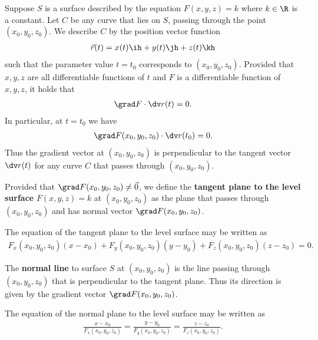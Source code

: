 \documentclass{article}
\begin{document}
\begin{theorem}
    Suppose $S$ is a surface described by the equation $F(x,y,z)=k$ where
    $k\in\R$ is a constant. Let $C$ be any curve that lies on $S$, passing
    through the point $(x_0,y_0,z_0)$. We describe $C$ by the position vector
    function
    \begin{align*}
        \vec r(t) = x(t)\ih + y(t)\jh + z(t)\kh
    \end{align*}
    such that the parameter value $t=t_0$ corresponds to $(x_0, y_0, z_0)$.
    Provided that $x,y,z$ are all differentiable functions of $t$ and $F$
    is a differentiable function of $x,y,z$, it holds that
    \begin{align*}
        \grad F \cdot \dv r(t) = 0.
    \end{align*}
    In particular, at $t=t_0$ we have
    \begin{align*}
        \grad F(x_0, y_0, z_0)\cdot \dv r(t_0) = 0.
    \end{align*}
    Thus the gradient vector at $(x_0, y_0, z_0)$ is perpendicular to the
    tangent vector $\dv r(t)$ for any curve $C$ that passes through
    $(x_0, y_0, z_0)$.
\end{theorem}
\begin{definition}
    Provided that $\grad F(x_0, y_0, z_0)\not=\vec 0$, we define the
    \textbf{tangent plane to the level surface} $F(x,y,z)=k$ at $(x_0, y_0, z_0)$
    as the plane that passes through $(x_0, y_0, z_0)$ and has normal vector
    $\grad F(x_0, y_0, z_0)$.
\end{definition}
\begin{theorem}
    The equation of the tangent plane to the level surface may be written as
    \begin{align*}
        F_x(x_0, y_0, z_0)(x-x_0)+F_y(x_0, y_0, z_0)(y-y_0)+F_z(x_0, y_0, z_0)(z-z_0)=0.
    \end{align*}
\end{theorem}
\begin{definition}
    The \textbf{normal line} to surface $S$ at $(x_0, y_0, z_0)$ is the line
    passing through $(x_0, y_0, z_0)$ that is perpendicular to the tangent
    plane. Thus its direction is given by the gradient vector
    $\grad F(x_0, y_0, z_0)$.
\end{definition}
\begin{theorem}
    The equation of the normal plane to the level surface may be written as
    \begin{align*}
        \frac{x-x_0}{F_x(x_0, y_0, z_0)}
        =\frac{y-y_0}{F_y(x_0, y_0, z_0)}
        =\frac{z-z_0}{F_z(x_0, y_0, z_0)}.
    \end{align*}
\end{theorem}
\end{document}
